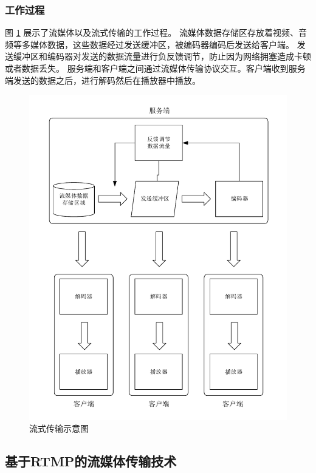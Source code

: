 \subsubsection{工作过程}
图 \ref{Fig:server} 展示了流媒体以及流式传输的工作过程。
流媒体数据存储区存放着视频、音频等多媒体数据，这些数据经过发送缓冲区，被编码器编码后发送给客户端。
发送缓冲区和编码器对发送的数据流量进行负反馈调节，防止因为网络拥塞造成卡顿或者数据丢失。
服务端和客户端之间通过流媒体传输协议交互。客户端收到服务端发送的数据之后，进行解码然后在播放器中播放。

\begin{figure}[ht]
    \centering
    \includegraphics[width=0.8\linewidth]{./Figure/IMG_server.pdf}
    \caption{流式传输示意图}
    \label{Fig:server}
\end{figure}


\subsection{基于RTMP的流媒体传输技术}


